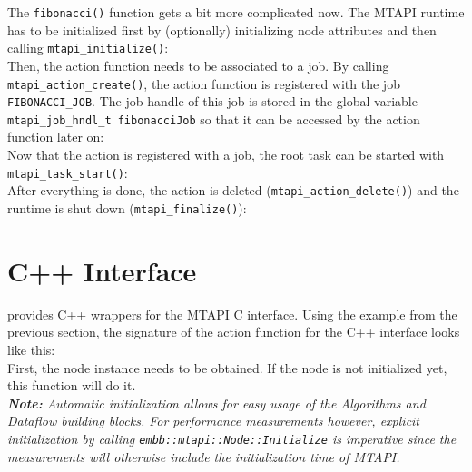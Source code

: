 The \lstinline|fibonacci()| function gets a bit more complicated now. The MTAPI runtime has to be initialized first by (optionally) initializing node attributes and then calling \lstinline|mtapi_initialize()|:
%
\\
%
Then, the action function needs to be associated to a job. By calling \lstinline|mtapi_action_create()|, the action function is registered with the job \lstinline|FIBONACCI_JOB|. The job handle of this job is stored in the global variable \lstinline|mtapi_job_hndl_t fibonacciJob| so that it can be accessed by the action function later on:
%
\\
%
Now that the action is registered with a job, the root task can be started with \lstinline|mtapi_task_start()|:
%
\\
%
After everything is done, the action is deleted (\lstinline|mtapi_action_delete()|) and the runtime is shut down (\lstinline|mtapi_finalize()|):
%
\\
%

\section{C++ Interface}
\label{sec:mtapi_cpp_interface}

\embb provides C++ wrappers for the MTAPI C interface. Using the example from the previous section, the signature of the action function for the C++ interface looks like this:
%
\\
%
First, the node instance needs to be obtained. If the node is not initialized yet, this function will do it.
%
\\
%
\emph{\textbf{Note:} Automatic initialization allows for easy usage of the \emph{Algorithms} and \emph{Dataflow} building blocks. For performance measurements however, explicit initialization by calling \lstinline|embb::mtapi::Node::Initialize| is imperative since the measurements will otherwise include the initialization time of MTAPI.}


